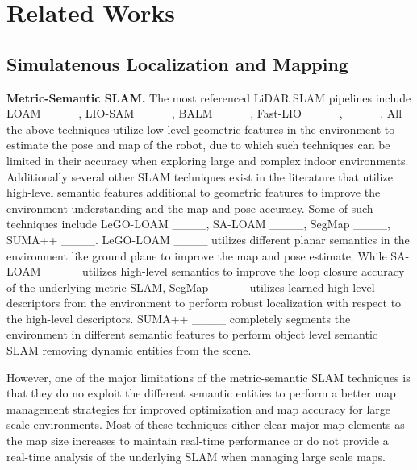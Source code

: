 \section{Related Works}
\label{sec:related_works}


\subsection{Simulatenous Localization and Mapping}

\textbf{Metric-Semantic SLAM.} The most referenced LiDAR SLAM pipelines include LOAM ____, LIO-SAM ____, BALM ____, Fast-LIO ____, ____. All the above techniques utilize low-level geometric features in the environment to estimate the pose and map of the robot, due to which such techniques can be limited in their accuracy when exploring large and complex indoor environments. Additionally several other SLAM techniques exist in the literature that utilize high-level semantic features additional to geometric features to improve the environment understanding and the map and pose accuracy. Some of such techniques include LeGO-LOAM ____, SA-LOAM ____, SegMap ____, SUMA++ ____. LeGO-LOAM ____ utilizes different planar semantics in the environment like ground plane to improve the map and pose estimate. While SA-LOAM ____ utilizes high-level semantics to improve the loop closure accuracy of the underlying metric SLAM, SegMap ____ utilizes learned high-level descriptors from the environment to perform robust localization with respect to the high-level descriptors. SUMA++ ____ completely segments the environment in different semantic features to perform object level semantic SLAM removing dynamic entities from the scene. 

However, one of the major limitations of the metric-semantic SLAM techniques is that they do no exploit the different semantic entities to perform a better map management strategies for improved optimization and map accuracy for large scale environments. Most of these techniques either clear major map elements as the map size increases to maintain real-time performance or do not provide a real-time analysis of the underlying SLAM when managing large scale maps.    

